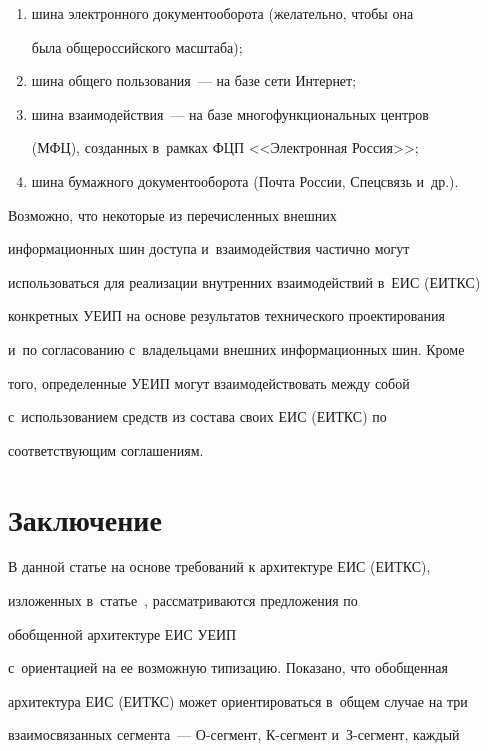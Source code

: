 \begin{enumerate}[(1)]
     \item шина электронного документооборота (желательно, чтобы она 

была общероссийского масштаба);

     \item шина общего пользования~--- на базе сети Интернет;

     \item шина взаимодействия~--- на базе многофункциональных центров 

(МФЦ), созданных в~рамках ФЦП <<Электронная Россия>>;

     \item шина бумажного документооборота (Почта России, Спецсвязь и~др.).

     \end{enumerate}

     

     Возможно, что некоторые из перечисленных внешних 

информационных шин доступа и~взаимодействия частично могут 

использоваться для реализации внут\-рен\-них взаимодействий в~ЕИС (ЕИТКС) 

конкретных УЕИП на основе результатов технического проектирования 

и~по согласованию с~владельцами внешних информационных шин. Кроме 

того, определенные УЕИП могут взаимодействовать между собой 

с~использованием средств из состава своих ЕИС (ЕИТКС) по 

соответствующим соглашениям.

     

\section{Заключение}



     В данной статье на основе требований к архитектуре ЕИС (ЕИТКС), 

изложенных в~статье~\cite{3-zat}, рассматриваются предложения по 

обобщенной архитектуре ЕИС УЕИП 

с~ориентацией на ее возможную типизацию. Показано, что обобщенная 

архитектура ЕИС (ЕИТКС) может ориентироваться в~общем случае на три 

взаимосвязанных сегмента~--- О-сег\-мент, К-сег\-мент и~З-сег\-мент, каждый 

